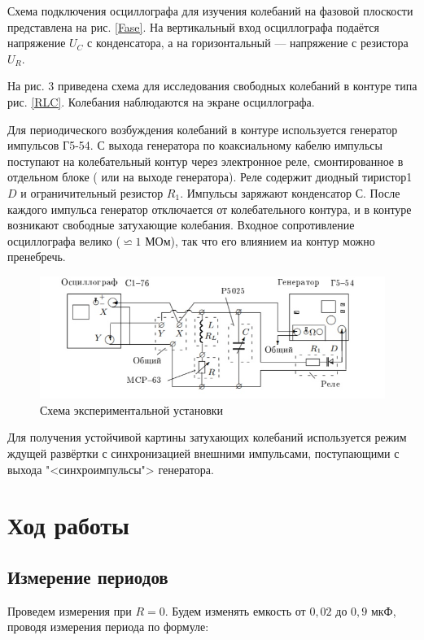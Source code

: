 Схема подключения осциллографа для изучения колебаний на фазовой плоскости представлена на рис. \ref{Fase}. На вертикальный вход осциллографа подаётся напряжение $ U_C $ с конденсатора, а на горизонтальный --- напряжение с резистора $ U_R $.

На рис. 3 приведена схема для исследования свободных колебаний в контуре типа рис. \ref{RLC}. Колебания наблюдаются на экране осциллографа.

Для периодического возбуждения колебаний в контуре используется
генератор импульсов Г5-54. С выхода генератора по коаксиальному кабелю импульсы поступают на колебательный контур через электронное
реле, смонтированное в отдельном блоке ( или на выходе генератора).
Реле содержит диодный тиристор1 $ D $ и ограничительный резистор $ R_1 $.
Импульсы заряжают конденсатор $ С $. После каждого импульса генератор
отключается от колебательного контура, и в контуре возникают
свободные затухающие колебания. Входное сопротивление осциллографа
велико ($ \backsimeq 1$ МОм), так что его влиянием иа контур можно пренебречь.

\begin{figure}[h]
	\includegraphics[width=15cm]{pics/scheme.jpg}
	\caption{Схема экспериментальной установки}
	\label{scheme}
\end{figure}

Для получения устойчивой картины затухающих колебаний используется
режим ждущей развёртки с синхронизацией внешними импульсами,
поступающими с выхода "<синхроимпульсы"> генератора.

\section{Ход работы}

\subsection{Измерение периодов}

Проведем измерения при ${R = 0}$. Будем изменять емкость от ${0,02}$ до ${0,9}$ мкФ, проводя измерения периода по формуле:


